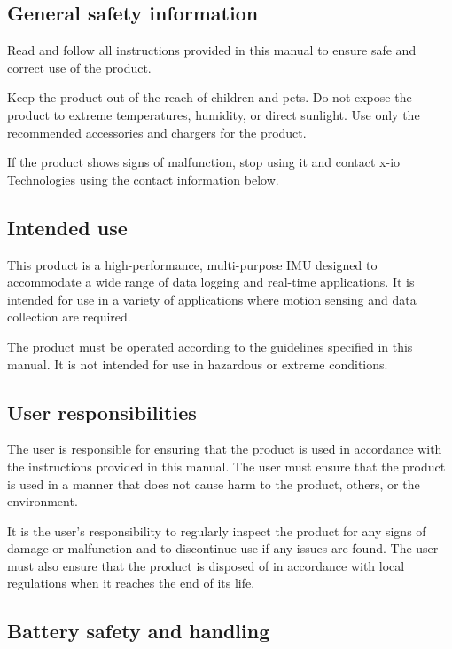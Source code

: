 
\subsection{General safety information}

Read and follow all instructions provided in this manual to ensure safe and correct use of the product.

Keep the product out of the reach of children and pets.  Do not expose the product to extreme temperatures, humidity, or direct sunlight. Use only the recommended accessories and chargers for the product.

If the product shows signs of malfunction, stop using it and contact x-io Technologies using the contact information below.

\subsection{Intended use}

This product is a high-performance, multi-purpose \ac{IMU} designed to accommodate a wide range of data logging and real-time applications. It is intended for use in a variety of applications where motion sensing and data collection are required.

The product must be operated according to the guidelines specified in this manual. It is not intended for use in hazardous or extreme conditions.

\subsection{User responsibilities}

The user is responsible for ensuring that the product is used in accordance with the instructions provided in this manual. The user must ensure that the product is used in a manner that does not cause harm to the product, others, or the environment.

It is the user’s responsibility to regularly inspect the product for any signs of damage or malfunction and to discontinue use if any issues are found. The user must also ensure that the product is disposed of in accordance with local regulations when it reaches the end of its life.

\subsection{Battery safety and handling}

